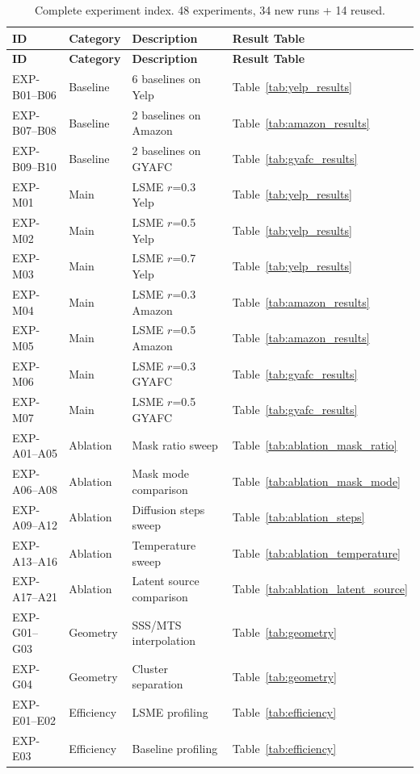 \documentclass{article}
\begin{document}
\begin{longtable}{llll}
\caption{Complete experiment index. 48 experiments, 34 new runs + 14 reused.}
\label{tab:exp_index} \\
\toprule
\textbf{ID} & \textbf{Category} & \textbf{Description} & \textbf{Result Table} \\
\midrule
\endfirsthead
\toprule
\textbf{ID} & \textbf{Category} & \textbf{Description} & \textbf{Result Table} \\
\midrule
\endhead
EXP-B01--B06 & Baseline & 6 baselines on Yelp & Table~\ref{tab:yelp_results} \\
EXP-B07--B08 & Baseline & 2 baselines on Amazon & Table~\ref{tab:amazon_results} \\
EXP-B09--B10 & Baseline & 2 baselines on GYAFC & Table~\ref{tab:gyafc_results} \\
\midrule
EXP-M01 & Main & LSME $r$=0.3 Yelp & Table~\ref{tab:yelp_results} \\
EXP-M02 & Main & LSME $r$=0.5 Yelp & Table~\ref{tab:yelp_results} \\
EXP-M03 & Main & LSME $r$=0.7 Yelp & Table~\ref{tab:yelp_results} \\
EXP-M04 & Main & LSME $r$=0.3 Amazon & Table~\ref{tab:amazon_results} \\
EXP-M05 & Main & LSME $r$=0.5 Amazon & Table~\ref{tab:amazon_results} \\
EXP-M06 & Main & LSME $r$=0.3 GYAFC & Table~\ref{tab:gyafc_results} \\
EXP-M07 & Main & LSME $r$=0.5 GYAFC & Table~\ref{tab:gyafc_results} \\
\midrule
EXP-A01--A05 & Ablation & Mask ratio sweep & Table~\ref{tab:ablation_mask_ratio} \\
EXP-A06--A08 & Ablation & Mask mode comparison & Table~\ref{tab:ablation_mask_mode} \\
EXP-A09--A12 & Ablation & Diffusion steps sweep & Table~\ref{tab:ablation_steps} \\
EXP-A13--A16 & Ablation & Temperature sweep & Table~\ref{tab:ablation_temperature} \\
EXP-A17--A21 & Ablation & Latent source comparison & Table~\ref{tab:ablation_latent_source} \\
\midrule
EXP-G01--G03 & Geometry & SSS/MTS interpolation & Table~\ref{tab:geometry} \\
EXP-G04 & Geometry & Cluster separation & Table~\ref{tab:geometry} \\
\midrule
EXP-E01--E02 & Efficiency & LSME profiling & Table~\ref{tab:efficiency} \\
EXP-E03 & Efficiency & Baseline profiling & Table~\ref{tab:efficiency} \\
\bottomrule
\end{longtable}
\end{document}
